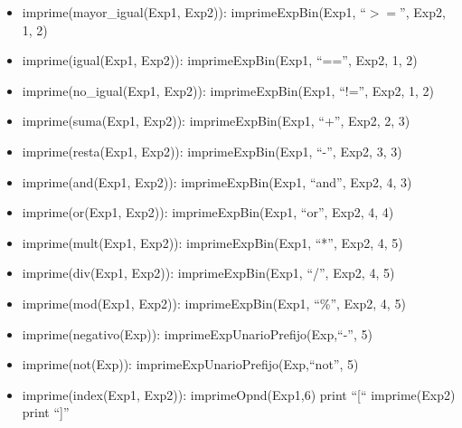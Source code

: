 \documentclass[11pt]{article}
\begin{document}
\begin{itemize}
            \item imprime(mayor\_igual(Exp1, Exp2)):
                \subitem imprimeExpBin(Exp1, “$>=$”, Exp2, 1, 2)
            
            \item imprime(igual(Exp1, Exp2)):
                \subitem imprimeExpBin(Exp1, “==”, Exp2, 1, 2)
            
            \item imprime(no\_igual(Exp1, Exp2)):
                \subitem imprimeExpBin(Exp1, “!=”, Exp2, 1, 2)
            
            \item imprime(suma(Exp1, Exp2)):
                \subitem imprimeExpBin(Exp1, “+”, Exp2, 2, 3)
            
            \item imprime(resta(Exp1, Exp2)):
                \subitem imprimeExpBin(Exp1, “-”, Exp2, 3, 3)
            
            \item imprime(and(Exp1, Exp2)):
                \subitem imprimeExpBin(Exp1, “and”, Exp2, 4, 3)
            
            \item imprime(or(Exp1, Exp2)):
                \subitem imprimeExpBin(Exp1, “or”, Exp2, 4, 4)
            
            \item imprime(mult(Exp1, Exp2)):
                \subitem imprimeExpBin(Exp1, “*”, Exp2, 4, 5)
            
            \item imprime(div(Exp1, Exp2)):
                \subitem imprimeExpBin(Exp1, “/”, Exp2, 4, 5)
            
            \item imprime(mod(Exp1, Exp2)):
                \subitem imprimeExpBin(Exp1, “\%”, Exp2, 4, 5)
            
            \item imprime(negativo(Exp)):
                \subitem imprimeExpUnarioPrefijo(Exp,“-”, 5)
            
            \item imprime(not(Exp)):
                \subitem imprimeExpUnarioPrefijo(Exp,“not”, 5)
            
            \item imprime(index(Exp1, Exp2)):
                \subitem imprimeOpnd(Exp1,6)
                \subitem print “[“
                \subitem imprime(Exp2)
                \subitem print “]”
            

\end{itemize}
\end{document}
